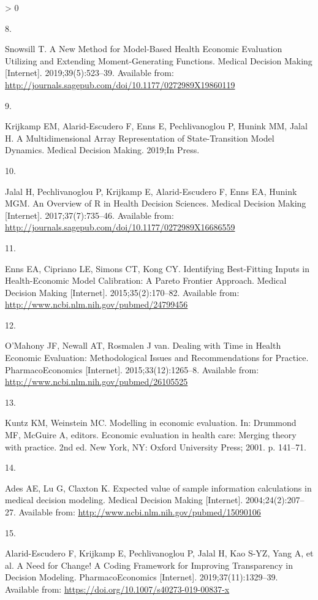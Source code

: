\documentclass[
]{article}
\newlength{\cslhangindent}
\newlength{\csllabelwidth}
\newenvironment{CSLReferences}[2] %
 {%
  \setlength{\parindent}{0pt}
  \ifodd #1 \everypar{\setlength{\hangindent}{\cslhangindent}}\ignorespaces\fi
  \ifnum #2 > 0
  \setlength{\parskip}{#2\baselineskip}
  \fi
 }%
 {}
\newcommand{\CSLLeftMargin}[1]{\parbox[t]{\csllabelwidth}{#1}}
\newcommand{\CSLRightInline}[1]{\parbox[t]{\linewidth - \csllabelwidth}{#1}\break}
\begin{document}
\begin{CSLReferences}{0}{0}
\leavevmode\hypertarget{ref-Snowsill2019}{}%
\CSLLeftMargin{8. }
\CSLRightInline{Snowsill T. {A New Method for Model-Based Health Economic Evaluation Utilizing and Extending Moment-Generating Functions}. Medical Decision Making {[}Internet{]}. 2019;39(5):523--39. Available from: \url{http://journals.sagepub.com/doi/10.1177/0272989X19860119}}

\leavevmode\hypertarget{ref-Krijkamp2019}{}%
\CSLLeftMargin{9. }
\CSLRightInline{Krijkamp EM, Alarid-Escudero F, Enns E, Pechlivanoglou P, Hunink MM, Jalal H. {A Multidimensional Array Representation of State-Transition Model Dynamics}. Medical Decision Making. 2019;In Press. }

\leavevmode\hypertarget{ref-Jalal2017b}{}%
\CSLLeftMargin{10. }
\CSLRightInline{Jalal H, Pechlivanoglou P, Krijkamp E, Alarid-Escudero F, Enns EA, Hunink MGM. {An Overview of R in Health Decision Sciences}. Medical Decision Making {[}Internet{]}. 2017;37(7):735--46. Available from: \url{http://journals.sagepub.com/doi/10.1177/0272989X16686559}}

\leavevmode\hypertarget{ref-Enns2015e}{}%
\CSLLeftMargin{11. }
\CSLRightInline{Enns EA, Cipriano LE, Simons CT, Kong CY. {Identifying Best-Fitting Inputs in Health-Economic Model Calibration: A Pareto Frontier Approach}. Medical Decision Making {[}Internet{]}. 2015;35(2):170--82. Available from: \url{http://www.ncbi.nlm.nih.gov/pubmed/24799456}}

\leavevmode\hypertarget{ref-OMahony2015}{}%
\CSLLeftMargin{12. }
\CSLRightInline{O'Mahony JF, Newall AT, Rosmalen J van. {Dealing with Time in Health Economic Evaluation: Methodological Issues and Recommendations for Practice.} PharmacoEconomics {[}Internet{]}. 2015;33(12):1265--8. Available from: \url{http://www.ncbi.nlm.nih.gov/pubmed/26105525}}

\leavevmode\hypertarget{ref-Kuntz2001}{}%
\CSLLeftMargin{13. }
\CSLRightInline{Kuntz KM, Weinstein MC. {Modelling in economic evaluation}. In: Drummond MF, McGuire A, editors. Economic evaluation in health care: Merging theory with practice. 2nd ed. New York, NY: Oxford University Press; 2001. p. 141--71. }

\leavevmode\hypertarget{ref-Ades2004a}{}%
\CSLLeftMargin{14. }
\CSLRightInline{Ades AE, Lu G, Claxton K. {Expected value of sample information calculations in medical decision modeling.} Medical Decision Making {[}Internet{]}. 2004;24(2):207--27. Available from: \url{http://www.ncbi.nlm.nih.gov/pubmed/15090106}}

\leavevmode\hypertarget{ref-Alarid-Escudero2019e}{}%
\CSLLeftMargin{15. }
\CSLRightInline{Alarid-Escudero F, Krijkamp E, Pechlivanoglou P, Jalal H, Kao S-YZ, Yang A, et al. {A Need for Change! A Coding Framework for Improving Transparency in Decision Modeling}. PharmacoEconomics {[}Internet{]}. 2019;37(11):1329--39. Available from: \url{https://doi.org/10.1007/s40273-019-00837-x}}


\end{CSLReferences}
\end{document}
